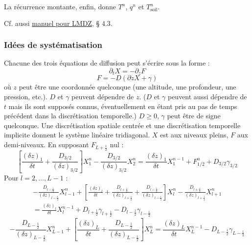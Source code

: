 \documentclass[a4paper,english,french]{article}
\begin{document}
La récurrence montante, enfin, donne $T^n$, $q^n$ et
$T_\mathrm{soil}^n$.

Cf. aussi
\href{../../../Documentation_LMDZ/LMDZ_texfol/LMDZ.pdf}{manuel pour
  LMDZ}, § 4.3.

\subsubsection{Idées de systématisation}

Chacune des trois équations de diffusion peut s'écrire sous la forme :
\begin{equation*}
  \partial_t X = - \partial_z F
\end{equation*}
\begin{equation*}
  F = - D (\partial z X + \gamma)
\end{equation*}
où $z$ peut être une coordonnée quelconque (une altitude, une
profondeur, une pression, etc.). $D$ et $\gamma$ peuvent dépendre de
$z$. ($D$ et $\gamma$ peuvent aussi dépendre de $t$ mais ils sont
supposés connus, éventuellement en étant pris au pas de temps
précédent dans la discrétisation temporelle.) $D \ge 0$, $\gamma$ peut
être de signe quelconque. Une discrétisation spatiale centrée et une
discrétisation temporelle implicite donnent le système linéaire
tridiagonal. $X$ est aux niveaux pleins, $F$ aux demi-niveaux. En
supposant $F_{L + \frac{1}{2}}$ nul :
\begin{equation*}
  \left[\frac{(\delta z)_1}{\delta t} + \frac{D_{3/2}}{(\delta z)_{3/2}} \right]
  X_1^n 
  - \frac{D_{3/2}}{(\delta z)_{3/2}} X_2^n
  = \frac{(\delta z)_1}{\delta t} X_1^{n - 1} + F_{1/2}^n + D_{3/2} \gamma_{3/2}
\end{equation*}
Pour $l = 2, \dots, L - 1$ :
\begin{multline*}
  - \frac{D_{l - \frac{1}{2}}}{(\delta z)_{l - \frac{1}{2}}} X_{l - 1}^n
  +
  \left[
    \frac{(\delta z)_l}{\delta t}
    + \frac{D_{l + \frac{1}{2}}}{(\delta z)_{l + \frac{1}{2}}}
    + \frac{D_{l - \frac{1}{2}}}{(\delta z)_{l - \frac{1}{2}}}
  \right]
  X_l^n
  - \frac{D_{l + \frac{1}{2}}}{(\delta z)_{l + \frac{1}{2}}} X_{l + 1}^n \\
  = \frac{(\delta z)_l}{\delta t} X_l^{n - 1}
  + D_{l + \frac{1}{2}} \gamma_{l + \frac{1}{2}}
  - D_{l - \frac{1}{2}} \gamma_{l - \frac{1}{2}}
\end{multline*}
\begin{equation*}
  - \frac{D_{L - \frac{1}{2}}}{(\delta z)_{L - \frac{1}{2}}} X_{L - 1}^n
  +
  \left[
    \frac{(\delta z)_L}{\delta t}
    + \frac{D_{L - \frac{1}{2}}}{(\delta z)_{L - \frac{1}{2}}}
  \right]
  X_L^n
  = \frac{(\delta z)_L}{\delta t} X_L^{n - 1}
  - D_{L - \frac{1}{2}} \gamma_{L - \frac{1}{2}}
\end{equation*}
\end{document}
